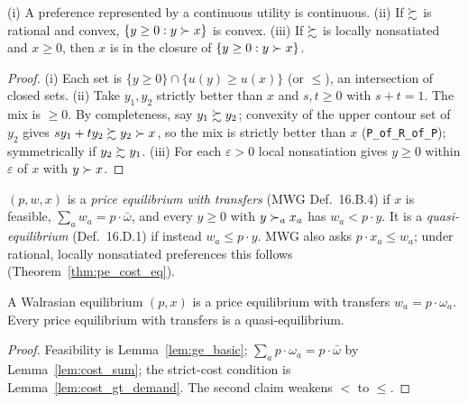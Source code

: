 \begin{lemma}
\label{lem:strictUpper}
\leanok
{}
(i) A preference represented by a continuous utility is continuous. (ii) If $\succsim$ is rational and convex,
$\{y \ge 0 : y \succ x\}$ is convex. (iii) If $\succsim$ is locally nonsatiated and $x \ge 0$, then $x$ is in the closure
of $\{y \ge 0 : y \succ x\}$.
\end{lemma}
\begin{proof}
\leanok
(i) Each set is $\{y \ge 0\} \cap \{u(y) \ge u(x)\}$ (or $\le$), an intersection of closed sets. (ii) Take $y_1, y_2$
strictly better than $x$ and $s, t \ge 0$ with $s + t = 1$. The mix is $\ge 0$. By completeness, say $y_1 \succsim y_2$;
convexity of the upper contour set of $y_2$ gives $s y_1 + t y_2 \succsim y_2 \succ x$, so the mix is strictly better
than $x$ (\texttt{P\_of\_R\_of\_P}); symmetrically if $y_2 \succsim y_1$. (iii) For each $\varepsilon > 0$ local
nonsatiation gives $y \ge 0$ within $\varepsilon$ of $x$ with $y \succ x$.
\end{proof}

\begin{definition}
\label{def:pe_transfers}
\leanok
{}
$(p, w, x)$ is a \emph{price equilibrium with transfers} (MWG Def.~16.B.4) if $x$ is feasible,
$\sum_a w_a = p \cdot \bar\omega$, and every $y \ge 0$ with $y \succ_a x_a$ has $w_a < p \cdot y$. It is a
\emph{quasi-equilibrium} (Def.~16.D.1) if instead $w_a \le p \cdot y$. MWG also asks $p \cdot x_a \le w_a$; under
rational, locally nonsatiated preferences this follows (Theorem~\ref{thm:pe_cost_eq}).
\end{definition}

\begin{lemma}
\label{lem:we_is_pe}
\leanok
{}
A Walrasian equilibrium $(p, x)$ is a price equilibrium with transfers $w_a = p \cdot \omega_a$. Every price
equilibrium with transfers is a quasi-equilibrium.
\end{lemma}
\begin{proof}
\leanok
Feasibility is Lemma~\ref{lem:ge_basic}; $\sum_a p \cdot \omega_a = p \cdot \bar\omega$ by Lemma~\ref{lem:cost_sum};
the strict-cost condition is Lemma~\ref{lem:cost_gt_demand}. The second claim weakens $<$ to $\le$.
\end{proof}

